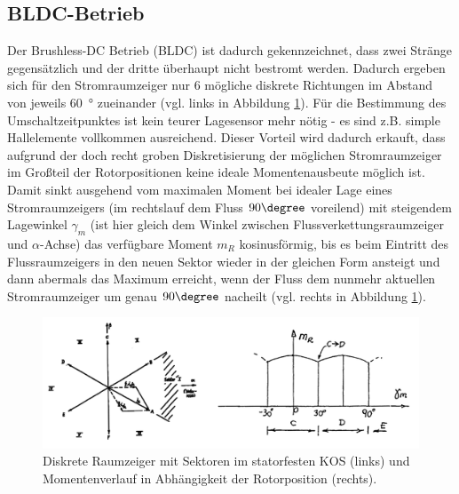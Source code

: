 \clearpage
\subsection{BLDC-Betrieb}
Der Brushless-DC Betrieb (BLDC) ist dadurch gekennzeichnet, dass zwei Stränge gegensätzlich und der dritte überhaupt nicht bestromt werden. Dadurch ergeben sich für den Stromraumzeiger nur 6 mögliche diskrete Richtungen im Abstand von jeweils \SI{60}{\degree} zueinander (vgl. links in Abbildung \ref{fig:bldc_schema}). Für die Bestimmung des Umschaltzeitpunktes ist kein teurer Lagesensor mehr nötig - es sind z.B. simple Hallelemente vollkommen ausreichend. Dieser Vorteil wird dadurch erkauft, dass aufgrund der doch recht groben Diskretisierung der möglichen Stromraumzeiger im Großteil der Rotorpositionen keine ideale Momentenausbeute möglich ist. Damit sinkt ausgehend vom maximalen Moment bei idealer Lage eines Stromraumzeigers (im rechtslauf dem Fluss $90\degree$ voreilend) mit steigendem Lagewinkel $\gamma_m$ (ist hier gleich dem Winkel zwischen Flussverkettungsraumzeiger und $\alpha$-Achse) das verfügbare Moment $m_R$ kosinusförmig, bis es beim Eintritt des Flussraumzeigers in den neuen Sektor wieder in der gleichen Form ansteigt und dann abermals das Maximum erreicht, wenn der Fluss dem nunmehr aktuellen Stromraumzeiger um genau $90\degree$ nacheilt (vgl. rechts in Abbildung \ref{fig:bldc_schema}).  

\begin{figure}[h!]
    \centering
    \includegraphics[scale=0.55]{2/BLDC.png}
    \caption{Diskrete Raumzeiger mit Sektoren im statorfesten KOS (links) und Momentenverlauf in Abhängigkeit der Rotorposition (rechts).}
    \label{fig:bldc_schema}
\end{figure}

